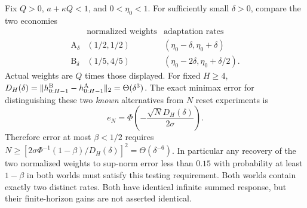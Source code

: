 \begin{theorem}\label{fhc:pair}
Fix $Q>0$, $a+\kappa Q<1$, and $0<\eta_0<1$. For sufficiently small
$\delta>0$, compare the two economies
\[
\begin{array}{c|cc}
 &\text{normalized weights}&\text{adaptation rates}\\ \hline
\mathrm A_\delta &(1/2,1/2)&(\eta_0-\delta,\eta_0+\delta)\\
\mathrm B_\delta &(1/5,4/5)&(\eta_0-2\delta,\eta_0+\delta/2).
\end{array}
\]
Actual weights are $Q$ times those displayed. For fixed $H\ge4$,
$D_H(\delta)=\|h^{\rm B}_{0:H-1}-h^{\rm A}_{0:H-1}\|_2
=\Theta(\delta^3)$. The exact minimax error for distinguishing these
two \emph{known} alternatives from $N$ reset experiments is
\[
 e_N=\Phi\!\left(-\frac{\sqrt N D_H(\delta)}{2\sigma}\right).
\]
Therefore error at most $\beta<1/2$ requires
$N\ge[2\sigma\Phi^{-1}(1-\beta)/D_H(\delta)]^2
=\Theta(\delta^{-6})$.
In particular any recovery of the two normalized weights to sup-norm error
less than $0.15$ with probability at least $1-\beta$ in both worlds must
satisfy this testing requirement.
Both worlds contain exactly two distinct rates. Both have identical infinite
summed response, but their finite-horizon gains are not asserted identical.
\end{theorem}

